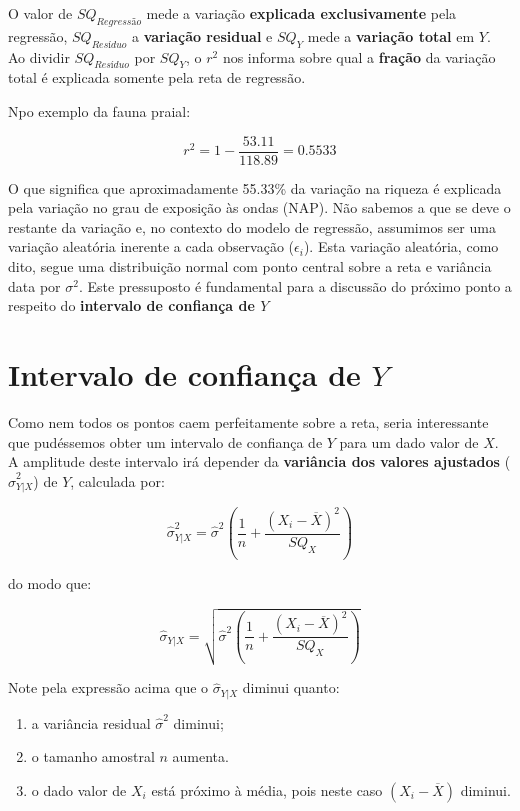 \documentclass[
]{book}
\providecommand{\tightlist}{%
  \setlength{\itemsep}{0pt}\setlength{\parskip}{0pt}}
\begin{document}
O valor de \(SQ_{Regressão}\) mede a variação \textbf{explicada exclusivamente} pela regressão, \(SQ_{Resíduo}\) a \textbf{variação residual} e \(SQ_Y\) mede a \textbf{variação total} em \(Y\). Ao dividir \(SQ_{Resíduo}\) por \(SQ_Y\), o \(r^2\) nos informa sobre qual a \textbf{fração} da variação total é explicada somente pela reta de regressão.

Npo exemplo da fauna praial:

\[r^2 = 1 - \frac{53.11}{118.89} = 0.5533\]

O que significa que aproximadamente 55.33\% da variação na riqueza é explicada pela variação no grau de exposição às ondas (NAP). Não sabemos a que se deve o restante da variação e, no contexto do modelo de regressão, assumimos ser uma variação aleatória inerente a cada observação (\(\epsilon_i\)). Esta variação aleatória, como dito, segue uma distribuição normal com ponto central sobre a reta e variância data por \(\sigma^2\). Este pressuposto é fundamental para a discussão do próximo ponto a respeito do \textbf{intervalo de confiança de \(Y\)}

\hypertarget{intervalo-de-confianuxe7a-de-y}{%
\section{\texorpdfstring{Intervalo de confiança de \(Y\)}{Intervalo de confiança de Y}}\label{intervalo-de-confianuxe7a-de-y}}

Como nem todos os pontos caem perfeitamente sobre a reta, seria interessante que pudéssemos obter um intervalo de confiança de \(Y\) para um dado valor de \(X\). A amplitude deste intervalo irá depender da \textbf{variância dos valores ajustados} (\(\hat{\sigma}^2_{Y|X}\)) de \(Y\), calculada por:

\[\hat{\sigma}^2_{Y|X} = \hat{\sigma}^2(\frac{1}{n} + \frac{(X_i-\overline{X})^2}{SQ_X})\]

do modo que:

\[\hat{\sigma}_{Y|X} = \sqrt{\hat{\sigma}^2(\frac{1}{n} + \frac{(X_i-\overline{X})^2}{SQ_X})}\]

Note pela expressão acima que o \(\hat{\sigma}_{Y|X}\) diminui quanto:

\begin{enumerate}
\def\labelenumi{\arabic{enumi}.}
\tightlist
\item
  a variância residual \(\hat{\sigma}^2\) diminui;
\item
  o tamanho amostral \(n\) aumenta.
\item
  o dado valor de \(X_i\) está próximo à média, pois neste caso \((X_i-\overline{X})\) diminui.
\end{enumerate}
\end{document}
